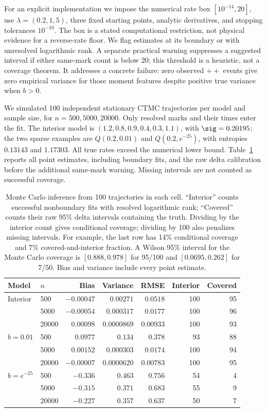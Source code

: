 For an explicit implementation we impose the numerical rate box
$[10^{-14},20]$, use $\lambda=(0.2,1,5)$, three fixed starting points,
analytic derivatives, and stopping tolerances $10^{-10}$. The box is a stated
computational restriction, not physical evidence for a reverse-rate floor.
We flag estimates at its boundary or with unresolved logarithmic rank.
A separate practical warning suppresses a suggested interval if either
same-mark count is below 20; this threshold is a heuristic, not a coverage
theorem. It addresses a concrete failure: zero observed $++$ events give
zero empirical variance for those moment features despite positive true
variance when $b>0$.

We simulated 100 independent stationary CTMC trajectories per model and
sample size, for $n=500,5000,20000$. Only resolved marks and their times enter
the fit. The interior model is $(1.2,0.8,0.9,0.4,0.3,1.1)$, with
$\sig=0.20195$; the two sparse examples are $Q(0.2,0.01)$ and
$Q(0.2,e^{-25})$, with entropies $0.13143$ and $1.17303$. All true rates
exceed the numerical lower bound. Table~\ref{tab:finite-data} reports all
point estimates, including boundary fits, and the raw delta calibration
before the additional same-mark warning. Missing intervals are not counted
as successful coverage.

\begin{table}[t]
\centering
\small
\begin{tabular}{llrrrrr}
\toprule
Model & $n$ & Bias & Variance & RMSE & Interior & Covered\\
\midrule
Interior & 500 & $-0.00047$ & $0.00271$ & $0.0518$ & 100 & 95\\
 & 5000 & $-0.00054$ & $0.000317$ & $0.0177$ & 100 & 96\\
 & 20000 & $0.00098$ & $0.0000869$ & $0.00933$ & 100 & 93\\
$b=0.01$ & 500 & $0.0977$ & $0.134$ & $0.378$ & 93 & 88\\
 & 5000 & $0.00152$ & $0.000303$ & $0.0174$ & 100 & 94\\
 & 20000 & $-0.00007$ & $0.0000620$ & $0.00783$ & 100 & 95\\
$b=e^{-25}$ & 500 & $-0.336$ & $0.463$ & $0.756$ & 54 & 4\\
 & 5000 & $-0.315$ & $0.371$ & $0.683$ & 55 & 9\\
 & 20000 & $-0.227$ & $0.357$ & $0.637$ & 50 & 7\\
\bottomrule
\end{tabular}
\caption{Monte Carlo inference from 100 trajectories in each cell. ``Interior''
counts successful nonboundary fits with resolved logarithmic rank; ``Covered''
counts their raw 95\% delta intervals containing the truth. Dividing by the
interior count gives conditional coverage; dividing by 100 also penalizes
missing intervals. For example, the last row has 14\% conditional coverage
and 7\% covered-and-interior fraction. A Wilson 95\% interval for the Monte
Carlo coverage is $[0.888,0.978]$ for 95/100 and $[0.0695,0.262]$ for 7/50.
Bias and variance include every point estimate.}\label{tab:finite-data}
\end{table}

